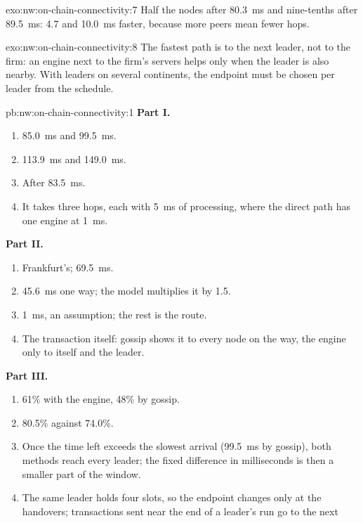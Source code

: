 \begin{solution}{exo:nw:on-chain-connectivity:7}
Half the nodes after \qty{80.3}{\milli\second} and nine-tenths after \qty{89.5}{\milli\second}: 4.7 and \qty{10.0}{\milli\second} faster, because more
peers mean fewer hops.
\end{solution}

\begin{solution}{exo:nw:on-chain-connectivity:8}
The fastest path is to the next leader, not to the firm: an engine next to the firm's servers helps only when the leader is also nearby. With leaders on
several continents, the endpoint must be chosen per leader from the schedule.
\end{solution}

\begin{solution}{pb:nw:on-chain-connectivity:1}
\textbf{Part I.}
\begin{enumerate}
\item \qty{85.0}{\milli\second} and \qty{99.5}{\milli\second}.
\item \qty{113.9}{\milli\second} and \qty{149.0}{\milli\second}.
\item After \qty{83.5}{\milli\second}.
\item It takes three hops, each with \qty{5}{\milli\second} of processing, where the direct path has one engine at \qty{1}{\milli\second}.
\end{enumerate}
\textbf{Part II.}
\begin{enumerate}[resume]
\item Frankfurt's; \qty{69.5}{\milli\second}.
\item \qty{45.6}{\milli\second} one way; the model multiplies it by 1.5.
\item \qty{1}{\milli\second}, an assumption; the rest is the route.
\item The transaction itself: gossip shows it to every node on the way, the engine only to itself and the leader.
\end{enumerate}
\textbf{Part III.}
\begin{enumerate}[resume]
\item 61\% with the engine, 48\% by gossip.
\item 80.5\% against 74.0\%.
\item Once the time left exceeds the slowest arrival (\qty{99.5}{\milli\second} by gossip), both methods reach every leader; the fixed difference in
  milliseconds is then a smaller part of the window.
\item The same leader holds four slots, so the endpoint changes only at the handovers; transactions sent near the end of a leader's run go to the next

\end{enumerate}
\end{solution}
